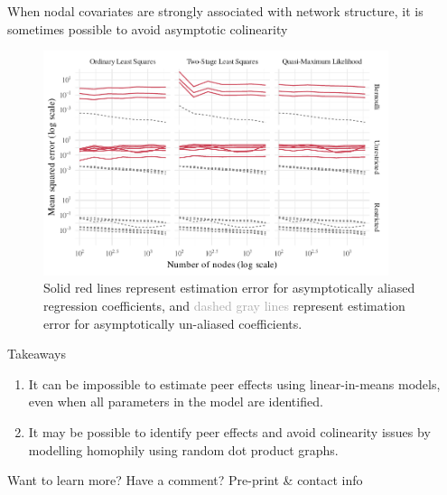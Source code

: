 \documentclass[final]{beamer}
\newlength{\colwidth}
\begin{document}
\begin{frame}[t]
\begin{columns}[t]
\begin{column}{\colwidth}
\begin{block}{When nodal covariates are strongly associated with network structure, it is sometimes possible to avoid asymptotic colinearity}
                \begin{figure}
                    \centering
                    \includegraphics[width=0.9\textwidth]{./figures/simulations/biometrika-mse-all.pdf}
                    \caption{\textcolor{Mahogany}{Solid red lines} represent estimation error for asymptotically aliased regression coefficients, and \textcolor{darkgray}{dashed gray lines} represent estimation error for asymptotically un-aliased coefficients.}
                \end{figure}

            \end{block}

            \begin{block}{Takeaways}
                \vspace{6mm}
                \begin{enumerate}
                    \setlength\itemsep{1.5em}
                    \item It can be impossible to estimate peer effects using linear-in-means models, even when all parameters in the model are identified.
                    \item It may be possible to identify peer effects and avoid colinearity issues by modelling homophily using random dot product graphs.
                \end{enumerate}
            \end{block}

            \begin{block}{Want to learn more? Have a comment? Pre-print \& contact info}
                \nocite{hayes2024c}
                \printbibliography



\end{block}
\end{column}
\end{columns}
\end{frame}
\end{document}
